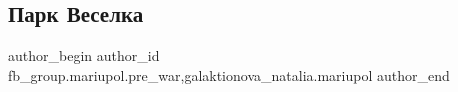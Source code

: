  
 
 
 
 

\subsection{Парк Веселка}
\label{sec:08_03_2023.fb.fb_group.mariupol.pre_war.3.park_veselka}
 
\ifcmt
 author_begin
   author_id fb_group.mariupol.pre_war,galaktionova_natalia.mariupol
 author_end
\fi

